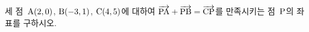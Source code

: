 세 점~$\mathrm{A}(2{,}\mkern3mu\mathopen{}0)$, $\mathrm{B}(-3{,}\mkern3mu\mathopen{}1)$, $\mathrm{C}(4{,}\mkern3mu\mathopen{}5)$에 대하여 $\overrightarrow{\mathrm{PA}}+\overrightarrow{\mathrm{PB}}=\overrightarrow{\mathrm{CP}}$를 만족시키는 점~$\mathrm{P}$의 좌표를 구하시오.
